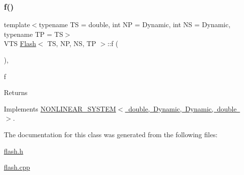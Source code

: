 \subsubsection{\texorpdfstring{f()}{f()}}
{\footnotesize\ttfamily template$<$typename TS = double, int NP = Dynamic, int NS = Dynamic, typename TP = TS$>$ \\
V\+TS \mbox{\hyperlink{class_flash}{Flash}}$<$ TS, NP, NS, TP $>$\+::f (\begin{DoxyParamCaption}{ }\end{DoxyParamCaption})\hspace{0.3cm}{\ttfamily [inline]}, {\ttfamily [virtual]}}



f 

\begin{DoxyReturn}{Returns}

\end{DoxyReturn}


Implements \mbox{\hyperlink{class_n_o_n_l_i_n_e_a_r___s_y_s_t_e_m_a65827d7df297f26cd3f14f472a212077}{N\+O\+N\+L\+I\+N\+E\+A\+R\+\_\+\+S\+Y\+S\+T\+E\+M$<$ double, Dynamic, Dynamic, double $>$}}.



The documentation for this class was generated from the following files\+:\begin{DoxyCompactItemize}
\item 
\mbox{\hyperlink{flash_8h}{flash.\+h}}\item 
\mbox{\hyperlink{flash_8cpp}{flash.\+cpp}}\end{DoxyCompactItemize}
